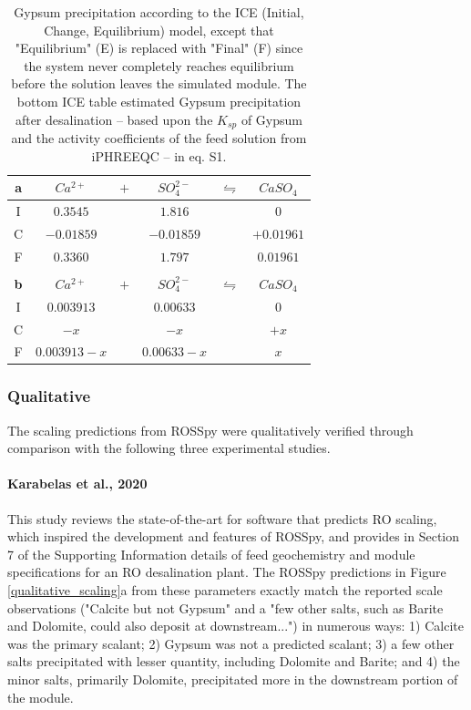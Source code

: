 \begin{table}
    \centering
    \begin{tabular}{c|ccccc}
      \toprule
      \textbf{a} & $Ca^{2+}$ & $+$ & $SO_4^{2-}$ & $\leftrightharpoons$ & $CaSO_4$ \\
      \midrule
      I & $0.3545$ && $1.816$ && $0$ \\
      C & $-0.01859$ && $-0.01859$ && $+0.01961$ \\
      F & $0.3360$ && $1.797$ && $0.01961$ \\
      \bottomrule
      \\
      \toprule
      \textbf{b} & $Ca^{2+}$ & $+$ & $SO_4^{2-}$ & $\leftrightharpoons$ & $CaSO_4$ \\
      \midrule
      I & $0.003913$ && $0.00633$ && $0$ \\
      C & $-x$ && $-x$ && $+x$ \\
      F & $0.003913-x$ && $0.00633-x$ && $x$ \\
      \bottomrule
    \end{tabular}
    \caption{
        Gypsum precipitation according to the ICE (Initial, Change, Equilibrium) model, except that "Equilibrium" (E) is replaced with "Final" (F) since the system never completely reaches equilibrium before the solution leaves the simulated module. The bottom ICE table estimated Gypsum precipitation after desalination -- based upon the $K_{sp}$ of Gypsum and the activity coefficients of the feed solution from iPHREEQC -- in eq. S1. 
      }
    \label{gypsum_ice_table}
\end{table}

\subsubsection{Qualitative}
The scaling predictions from ROSSpy were qualitatively verified through comparison with the following three experimental studies. 

\paragraph{Karabelas et al., 2020 \cite{Karabelas2020ScalingTools}}
This study reviews the state-of-the-art for software that predicts RO scaling, which inspired the development and features of ROSSpy, and provides in Section 7 of the Supporting Information details of feed geochemistry and module specifications for an RO desalination plant. The ROSSpy predictions in Figure \ref{qualitative_scaling}a from these parameters exactly match the reported scale observations ("Calcite but not Gypsum" and a "few other salts, such as Barite and Dolomite, could also deposit at downstream...") in numerous ways: 1) Calcite was the primary scalant; 2) Gypsum was not a predicted scalant; 3) a few other salts precipitated with lesser quantity, including Dolomite and Barite; and 4) the minor salts, primarily Dolomite, precipitated more in the downstream portion of the module.  

